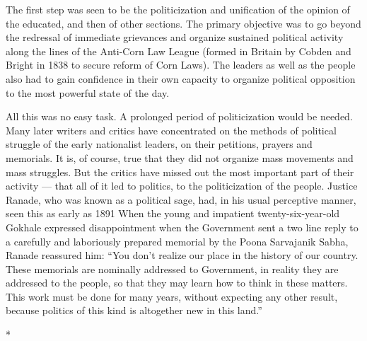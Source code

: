 The first step was seen to be the politicization and unification of the opinion of the educated, and then of other sections. The primary objective was to go beyond the redressal of immediate grievances and organize sustained political activity along the lines of the Anti-Corn Law League (formed in Britain by Cobden and Bright in 1838 to secure reform of Corn Laws). The leaders as well as the people also had to gain confidence in their own capacity to organize political opposition to the most powerful state of the day.

All this was no easy task. A prolonged period of politicization would be needed. Many later writers and critics have concentrated on the methods of political struggle of the early nationalist leaders, on their petitions, prayers and memorials. It is, of course, true that they did not organize mass movements and mass struggles. But the critics have missed out the most important part of their activity --- that all of it led to politics, to the politicization of the people. Justice Ranade, who was known as a political sage, had, in his usual perceptive manner, seen this as early as 1891 When the young and impatient twenty-six-year-old Gokhale expressed disappointment when the Government sent a two line reply to a carefully and laboriously prepared memorial by the Poona Sarvajanik Sabha, Ranade reassured him: ``You don't realize our place in the history of our country. These memorials are nominally addressed to Government, in reality they are addressed to the people, so that they may learn how to think in these matters. This work must be done for many years, without expecting any other result, because politics of this kind is altogether new in this land.''

\begin{center}*\end{center}

\paragraph*{}

